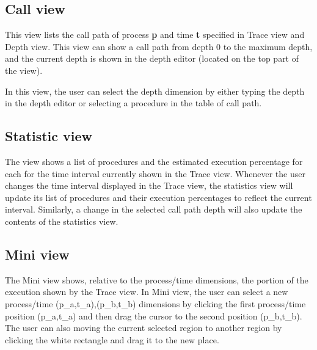 \documentclass[english]{article}
\begin{document}
\subsection{Call view}

This view lists the call path of process \textbf{p} and time \textbf{t} specified in Trace view and Depth view.
This view can show a call path from depth $0$ to the maximum depth, and the current depth is shown in the depth editor (located on the top part of the view).

In this view, the user can select the depth dimension by either typing the depth in the depth editor or selecting a procedure in the table of call path.


\subsection{Statistic view}

The view shows a list of procedures and the estimated execution percentage for each for the time interval currently shown in the Trace view.
  Whenever the user changes the time interval displayed in the Trace view, the statistics view will update its list of procedures and their execution percentages to
  reflect the current interval.  Similarly, a change in the selected call path depth will also update the contents of the statistics view.


\subsection{Mini view}

The Mini view shows, relative to the process/time dimensions, the portion of the execution shown by the Trace view.
In Mini view, the user can select a new process/time (p_a,t_a),(p_b,t_b) dimensions by clicking the first process/time position (p_a,t_a) and then drag the cursor to the second position (p_b,t_b).
The user can also moving the current selected region to another region by clicking the white rectangle and drag it to the new place.
\end{document}
